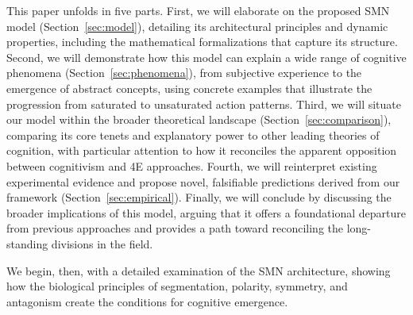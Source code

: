 This paper unfolds in five parts. First, we will elaborate on the proposed SMN model (Section~\ref{sec:model}), detailing its architectural principles and dynamic properties, including the mathematical formalizations that capture its structure. Second, we will demonstrate how this model can explain a wide range of cognitive phenomena (Section~\ref{sec:phenomena}), from subjective experience to the emergence of abstract concepts, using concrete examples that illustrate the progression from saturated to unsaturated action patterns. Third, we will situate our model within the broader theoretical landscape (Section~\ref{sec:comparison}), comparing its core tenets and explanatory power to other leading theories of cognition, with particular attention to how it reconciles the apparent opposition between cognitivism and 4E approaches. Fourth, we will reinterpret existing experimental evidence and propose novel, falsifiable predictions derived from our framework (Section~\ref{sec:empirical}). Finally, we will conclude by discussing the broader implications of this model, arguing that it offers a foundational departure from previous approaches and provides a path toward reconciling the long-standing divisions in the field.

We begin, then, with a detailed examination of the SMN architecture, showing how the biological principles of segmentation, polarity, symmetry, and antagonism create the conditions for cognitive emergence.